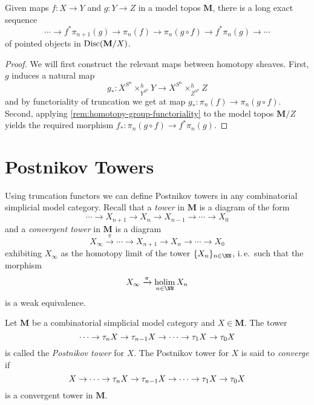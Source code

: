 \begin{proposition}
  Given maps \(f\colon X\to Y\) and \(g\colon Y\to Z\) in a model
  topos \(\mathbf M\), there is a long exact sequence
  \[
  \cdots \to f^{*}\pi_{n+1}(g) \to \pi_{n}(f) \to \pi_{n}(g\circ f) \to f^{*}\pi_{n}(g) \to \cdots
  \]
  of pointed objects in \(\operatorname{\textnormal{Disc}}(\mathbf M/X)\).
\end{proposition}
\begin{proof}
  We will first construct the relevant maps between homotopy
  sheaves. First, \(g\) induces a natural map
  \[
  g_{*}\colon X^{S^{n}}\times^{h}_{Y^{S^{n}}} Y\to
  X^{S^{n}}\times^{h}_{Z^{S^{n}}} Z
  \]
  and by functoriality of truncation we get at map \(g_{*}\colon
  \pi_{n}(f)\to\pi_{n}(g\circ f)\). Second, applying
  \autoref{rem:homotopy-group-functoriality} to the model topos
  \(\mathbf M/Z\) yields the required morphism \(f_{*}\colon
  \pi_{n}(g\circ f)\to f^{*}\pi_{n}(g)\).
\end{proof}


\section{Postnikov Towers}

Using truncation functors we can define Postnikov towers in any
combinatorial simplicial model category. Recall that a \emph{tower} in
\(\mathbf M\) is a diagram of the form
\[
\cdots \to X_{n+1}\to X_{n}\to X_{n-1}\to \cdots \to X_{0}
\]
and a \emph{convergent tower} in \(\mathbf M\) is a diagram
\[
X_{\infty}\xrightarrow{\pi} \cdots \to X_{n+1}\to X_{n}\to\cdots\to
X_{0}
\]
exhibiting \(X_{\infty}\) as the homotopy limit of the tower
\(\{X_{n}\}_{n\in\NN}\), i.\,e.~such that the morphism
\[
X_{\infty}\xrightarrow{\pi}\holim_{n\in\NN} X_{n}
\]
is a weak equivalence.

\begin{definition}
  Let \(\mathbf M\) be a combinatorial simplicial model category and
  \(X\in\mathbf M\). The tower
  \[
  \cdots\to\tau_{n} X\to\tau_{n-1} X\to\cdots\to\tau_{1}
  X\to\tau_{0}X
  \]
  is called the \emph{Postnikov tower} for \(X\). The Postnikov tower
  for \(X\) is said to \emph{converge} if
  \[
  X\to\cdots\to\tau_{n} X\to\tau_{n-1} X\to\cdots\to\tau_{1}
  X\to\tau_{0}X
  \]
  is a convergent tower in \(\mathbf M\).
\end{definition}

\printbibliography

\listoftodos


